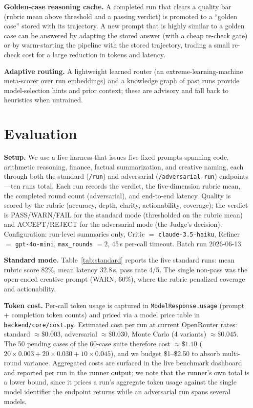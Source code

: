\documentclass{article}
\begin{document}
\textbf{Golden-case reasoning cache.} A completed run that clears a quality bar (rubric mean
above threshold and a passing verdict) is promoted to a ``golden case'' stored with its
trajectory. A new prompt that is highly similar to a golden case can be answered by adapting
the stored answer (with a cheap re-check gate) or by warm-starting the pipeline with the
stored trajectory, trading a small re-check cost for a large reduction in tokens and latency.

\textbf{Adaptive routing.} A lightweight learned router (an extreme-learning-machine
meta-scorer over run embeddings) and a knowledge graph of past runs provide model-selection
hints and prior context; these are advisory and fall back to heuristics when untrained.

\section{Evaluation}
\label{sec:eval}
\textbf{Setup.} We use a live harness that issues five fixed prompts spanning code,
arithmetic reasoning, finance, factual summarization, and creative naming, each through both
the standard (\texttt{/run}) and adversarial (\texttt{/adversarial-run}) endpoints---ten runs
total. Each run records the verdict, the five-dimension rubric mean, the completed round count
(adversarial), and end-to-end latency. Quality is scored by the rubric (accuracy, depth,
clarity, actionability, coverage); the verdict is PASS/WARN/FAIL for the standard mode
(thresholded on the rubric mean) and ACCEPT/REJECT for the adversarial mode (the Judge's
decision). Configuration: run-level summaries only, Critic $=$ \texttt{claude-3.5-haiku},
Refiner $=$ \texttt{gpt-4o-mini}, \texttt{max\_rounds} $=2$, 45\,s per-call timeout. Batch run
2026-06-13.

\textbf{Standard mode.} Table~\ref{tab:standard} reports the five standard runs: mean rubric
score 82\%, mean latency 32.8\,s, pass rate 4/5. The single non-pass was the open-ended
creative prompt (WARN, 60\%), where the rubric penalized coverage and actionability.

\textbf{Token cost.} Per-call token usage is captured in \texttt{ModelResponse.usage}
(prompt + completion token counts) and priced via a model price table in
\texttt{backend/core/cost.py}. Estimated cost per run at current OpenRouter rates:
standard $\approx\$0.003$, adversarial $\approx\$0.030$, Monte Carlo (4 variants)
$\approx\$0.045$. The 50 pending cases of the 60-case suite there\-fore cost
$\approx\$1.10$ ($20\times0.003 + 20\times0.030 + 10\times0.045$), and we budget
\$1--\$2.50 to absorb multi-round variance. Aggregated costs are surfaced in the live
benchmark dashboard and reported per run in the runner output; we note that the runner's
own total is a lower bound, since it prices a run's aggregate token usage against the
single model identifier the endpoint returns while an adversarial run spans several
models.
\end{document}
